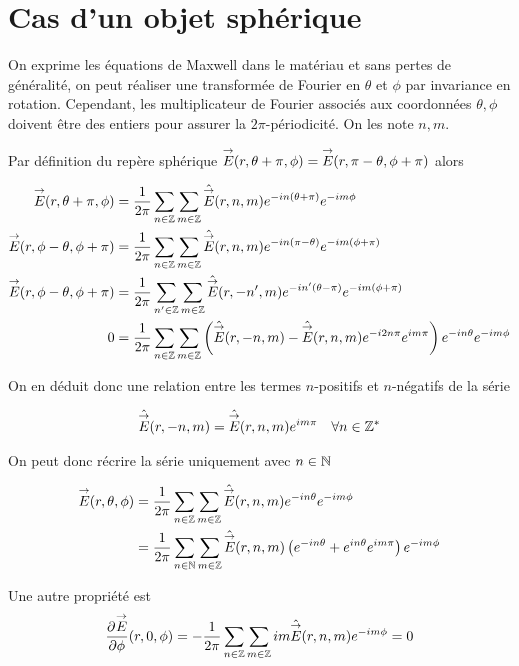 \section{Cas d'un objet sphérique}

    On exprime les équations de Maxwell dans le matériau et sans pertes de généralité, on peut réaliser une transformée de Fourier en \(\theta\) et \(\phi\) par invariance en rotation.
    Cependant, les multiplicateur de Fourier associés aux coordonnées \(\theta,\phi\) doivent être des entiers pour assurer la \(2\pi\)-périodicité. On les note \(n,m\).

    Par définition du repère sphérique \({\overset{\rightarrow}{E}}(r,\theta+\pi,\phi) =  {\overset{\rightarrow}{E}}(r,\pi-\theta,\phi + \pi)\) alors

    \begin{align}
        {\overset{\rightarrow}{E}}(r,\theta+\pi,\phi) &= \dfrac{1}{2\pi}\sum_{n\in\mathbb Z}\sum_{m\in\mathbb Z} \hat{{\overset{\rightarrow}{E}}}(r,n,m) e^{-in(\theta+\pi)} e^{-im\phi}
        \\
        {\overset{\rightarrow}{E}}(r,\phi-\theta,\phi+\pi)&=\dfrac{1}{2\pi}\sum_{n\in\mathbb Z}\sum_{m\in\mathbb Z} \hat{{\overset{\rightarrow}{E}}}(r,n,m) e^{-in( \pi - \theta)} e^{-im(\phi+ \pi)}
        \\
        {\overset{\rightarrow}{E}}(r,\phi-\theta,\phi+\pi)&=\dfrac{1}{2\pi}\sum_{n'\in\mathbb Z}\sum_{m\in\mathbb Z} \hat{{\overset{\rightarrow}{E}}}(r,-n',m) e^{-in'(\theta-\pi)} e^{-im(\phi+ \pi)}
        \\
        0&=\dfrac{1}{2\pi}\sum_{n\in\mathbb Z}\sum_{m\in\mathbb Z} \left( \hat{{\overset{\rightarrow}{E}}}(r,-n,m) - \hat{{\overset{\rightarrow}{E}}}(r,n,m)e^{-i2n\pi}e^{im\pi}\right)e^{-in\theta}e^{-im\phi}
    \end{align}

    On en déduit donc une relation entre les termes \(n\)-positifs et \(n\)-négatifs de la série

    \begin{align}
        \hat{{\overset{\rightarrow}{E}}}(r,-n,m) = \hat{{\overset{\rightarrow}{E}}}(r,n,m)e^{im\pi} && \forall n \in\mathbb Z^*
    \end{align}

    On peut donc récrire la série uniquement avec \(n\in\mathbb N\)

    \begin{align}
        {\overset{\rightarrow}{E}}(r,\theta,\phi) &= \dfrac{1}{2\pi}\sum_{n\in\mathbb Z}\sum_{m\in\mathbb Z} \hat{{\overset{\rightarrow}{E}}}(r,n,m) e^{-in\theta} e^{-im\phi}
        \\
        &= \dfrac{1}{2\pi}\sum_{n\in\mathbb N}\sum_{m\in\mathbb Z} \hat{{\overset{\rightarrow}{E}}}(r,n,m) \left( e^{-in\theta} + e^{in\theta}e^{im\pi}\right)e^{-im\phi}
    \end{align}

    Une autre propriété est 
    \begin{equation}
        \displaystyle\dfrac{\partial^{{}} {\overset{\rightarrow}{E}}}{{\partial \phi}^{{}}}(r,0,\phi) = -\dfrac{1}{2\pi}\sum_{n\in\mathbb Z}\sum_{m\in\mathbb Z} im\hat{{\overset{\rightarrow}{E}}}(r,n,m) e^{-im\phi}= 0
    \end{equation}

